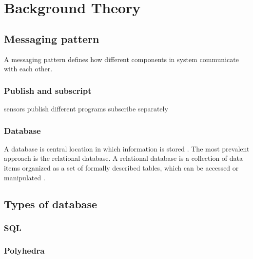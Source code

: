 \section{Background Theory}

\subsection{Messaging pattern}
A messaging pattern defines how different components in system communicate with each other.

	\subsubsection{Publish and subscript}
	sensors publish
    different programs subscribe separately
    
    \subsubsection{Database}
    A database is central location in which information is stored \cite{databasedefinition}. The most prevalent approach is the relational database. A relational database is a collection of data items organized as a set of formally described tables, which can be accessed or manipulated \cite{relationaldatabasedefinition}.

\subsection{Types of database}

  \subsubsection{SQL}

  \subsubsection{Polyhedra}